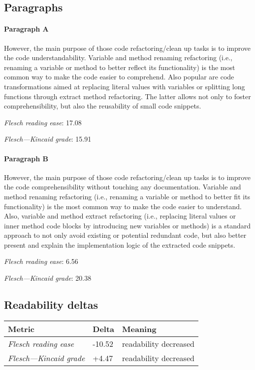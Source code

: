 \subsection{Paragraphs}
\paragraph{Paragraph A}
However, the main purpose of those code refactoring/clean up tasks is to improve the code understandability. Variable and method renaming refactoring (i.e., renaming a variable or method to better reflect its functionality) is the most common way to make the code easier to comprehend. Also popular are code transformations aimed at replacing literal values with variables or splitting long functions through extract method refactoring. The latter allows not only to foster comprehensibility, but also the reusability of small code snippets.\par\medskip
\emph{Flesch reading ease}: 17.08\par
\emph{Flesch---Kincaid grade}: 15.91

\paragraph{Paragraph B}
However, the main purpose of those code refactoring/clean up tasks is to improve the code comprehensibility without touching any documentation. Variable and method renaming refactoring (i.e., renaming a variable or method to better fit its functionality) is the most common way to make the code easier to understand. Also, variable and method extract refactoring (i.e., replacing literal values or inner method code blocks by introducing new variables or methods) is a standard approach to not only avoid existing or potential redundant code, but also better present and explain the implementation logic of the extracted code snippets.\par\medskip
\emph{Flesch reading ease}: 6.56\par
\emph{Flesch---Kincaid grade}: 20.38

\subsection{Readability deltas}

\begin{tabular}{lll}
\toprule
               \textbf{Metric} & \textbf{Delta} &       \textbf{Meaning} \\
\midrule
    \emph{Flesch reading ease} &         -10.52 &  readability decreased \\
 \emph{Flesch---Kincaid grade} &          +4.47 &  readability decreased \\
\bottomrule
\end{tabular}

